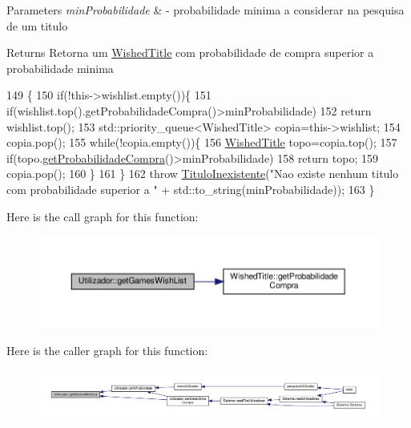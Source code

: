 \begin{DoxyParams}{Parameters}
{\em min\+Probabilidade} & -\/ probabilidade minima a considerar na pesquisa de um titulo \\
\hline
\end{DoxyParams}
\begin{DoxyReturn}{Returns}
Retorna um \hyperlink{classWishedTitle}{Wished\+Title} com probabilidade de compra superior a probabilidade minima 
\end{DoxyReturn}

\begin{DoxyCode}
149                                                               \{
150     \textcolor{keywordflow}{if}(!this->wishlist.empty())\{
151         \textcolor{keywordflow}{if}(wishlist.top().getProbabilidadeCompra()>minProbabilidade)
152             \textcolor{keywordflow}{return} wishlist.top();
153         std::priority\_queue<WishedTitle> copia=this->wishlist;
154         copia.pop();
155         \textcolor{keywordflow}{while}(!copia.empty())\{
156             \hyperlink{classWishedTitle}{WishedTitle} topo=copia.top();
157             \textcolor{keywordflow}{if}(topo.\hyperlink{classWishedTitle_a9076a3f48cb0bbd435908c392e5041a9}{getProbabilidadeCompra}()>minProbabilidade)
158                 \textcolor{keywordflow}{return} topo;
159             copia.pop();
160         \}
161     \}
162     \textcolor{keywordflow}{throw} \hyperlink{classTituloInexistente}{TituloInexistente}(\textcolor{stringliteral}{"Nao existe nenhum titulo com probabilidade superior a "} + 
      std::to\_string(minProbabilidade));
163 \}
\end{DoxyCode}
Here is the call graph for this function\+:
\nopagebreak
\begin{figure}[H]
\begin{center}
\leavevmode
\includegraphics[width=350pt]{classUtilizador_a9b80c93b8e8f7716e4ab77b2e1b47071_cgraph}
\end{center}
\end{figure}
Here is the caller graph for this function\+:
\nopagebreak
\begin{figure}[H]
\begin{center}
\leavevmode
\includegraphics[width=350pt]{classUtilizador_a9b80c93b8e8f7716e4ab77b2e1b47071_icgraph}
\end{center}
\end{figure}
\mbox{\label{classUtilizador_a2fc6ea78068d43766a6bc344a3059f61}} 
